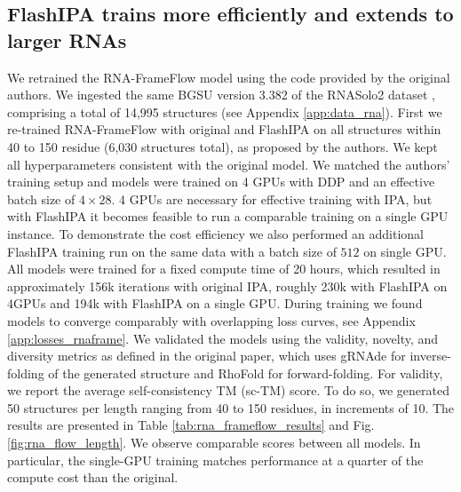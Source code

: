 \documentclass{article}
\begin{document}
\subsection{FlashIPA trains more efficiently and extends to larger RNAs}
We retrained the RNA-FrameFlow model using the code provided by the original authors. We ingested the same BGSU version 3.382 of the RNASolo2 dataset \cite{adamczyk2022rnasolo}, comprising a total of 14,995 structures (see Appendix \ref{app:data_rna}). First we re-trained RNA-FrameFlow with original and FlashIPA on all structures within 40 to 150 residue (6,030 structures total), as proposed by the authors. We kept all hyperparameters consistent with the original model. We matched the authors' training setup and models were trained on 4 GPUs with DDP and an effective batch size of $4\times 28$. 4 GPUs are necessary for effective training with IPA, but with FlashIPA it becomes feasible to run a comparable training on a single GPU instance. To demonstrate the cost efficiency we also performed an additional FlashIPA training run on the same data with a batch size of $512$ on single GPU. All models were trained for a fixed compute time of 20 hours, which resulted in approximately 156k iterations with original IPA, roughly 230k with FlashIPA on 4GPUs and 194k with FlashIPA on a single GPU. During training we found models to converge comparably with overlapping loss curves, see Appendix \ref{app:losses_rnaframe}. We validated the models using the validity, novelty, and diversity metrics as defined in the original paper, which uses gRNAde \cite{joshi2025grnade} for inverse-folding of the generated structure and RhoFold \cite{shen2022e2efold} for forward-folding. For validity, we report the average self-consistency TM (sc-TM) score. To do so, we generated 50 structures per length ranging from 40 to 150 residues, in increments of 10. The results are presented in Table \ref{tab:rna_frameflow_results} and Fig. \ref{fig:rna_flow_length}. We observe comparable scores between all models. In particular, the single-GPU training matches performance at a quarter of the compute cost than the original. 
\end{document}
